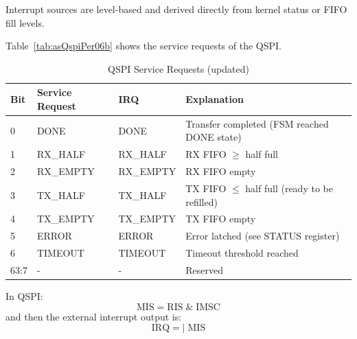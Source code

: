 

Interrupt sources are level-based and derived directly from kernel status
or FIFO fill levels.

Table~\ref{tab:asQspiPer06b} shows the service requests of the QSPI.
\begin{table}[H]
\caption{QSPI Service Requests (updated)}
\label{tab:asQspiPer06c}
\centering
\begin{tabularx}{\textwidth}{|l |l |l |X|}
  \hline
  Bit & Service Request & IRQ & Explanation \\
  \hline
  \hline
  0 & DONE      & DONE      & Transfer completed (FSM reached DONE state) \\
  \hline
  1 & RX\_HALF  & RX\_HALF  & RX FIFO $\geq$ half full \\
  \hline
  2 & RX\_EMPTY & RX\_EMPTY & RX FIFO empty \\
  \hline
  3 & TX\_HALF  & TX\_HALF  & TX FIFO $\leq$ half full (ready to be refilled) \\
  \hline
  4 & TX\_EMPTY & TX\_EMPTY & TX FIFO empty \\
  \hline
  5 & ERROR     & ERROR     & Error latched (see STATUS register) \\
  \hline
  6 & TIMEOUT   & TIMEOUT   & Timeout threshold reached \\
  \hline
  63:7 & -       & -         & Reserved \\
  \hline
\end{tabularx}
\end{table}

In QSPI: \[ \text{MIS} = \text{RIS} \;\&\; \text{IMSC} \]
and then the external interrupt output is: \[ \text{IRQ} = |\;\text{MIS} \]


